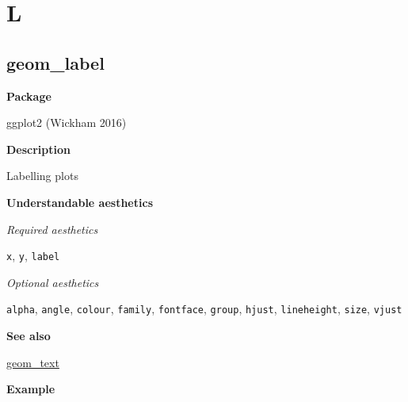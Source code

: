 \documentclass[
  letterpaper,
  DIV=11,
  numbers=noendperiod]{scrreprt}
\begin{document}

\chapter{L}\label{sec-l}

\section{geom\_label}\label{geom_label}

\textbf{Package}

ggplot2 (Wickham 2016)

\textbf{Description}

Labelling plots

\textbf{Understandable aesthetics}

\emph{Required aesthetics}

\texttt{x}, \texttt{y}, \texttt{label}

\emph{Optional aesthetics}

\texttt{alpha}, \texttt{angle}, \texttt{colour}, \texttt{family},
\texttt{fontface}, \texttt{group}, \texttt{hjust}, \texttt{lineheight},
\texttt{size}, \texttt{vjust}

\textbf{See also}

\hyperref[text]{geom\_text}

\textbf{Example}
\end{document}
